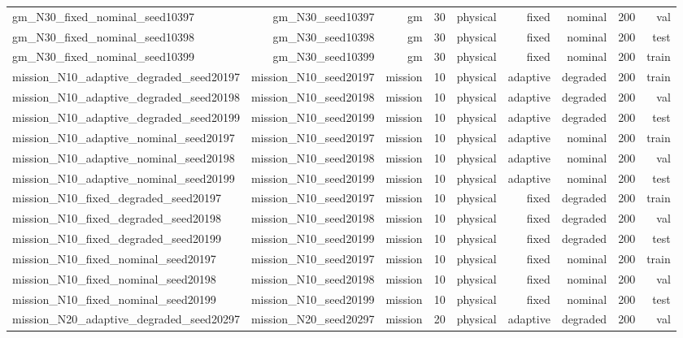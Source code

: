 \begin{tabular}{lrrrrrrrr}
gm\_N30\_fixed\_nominal\_seed10397 & gm\_N30\_seed10397 & gm & 30 & physical & fixed & nominal & 200 & val \\
gm\_N30\_fixed\_nominal\_seed10398 & gm\_N30\_seed10398 & gm & 30 & physical & fixed & nominal & 200 & test \\
gm\_N30\_fixed\_nominal\_seed10399 & gm\_N30\_seed10399 & gm & 30 & physical & fixed & nominal & 200 & train \\
mission\_N10\_adaptive\_degraded\_seed20197 & mission\_N10\_seed20197 & mission & 10 & physical & adaptive & degraded & 200 & train \\
mission\_N10\_adaptive\_degraded\_seed20198 & mission\_N10\_seed20198 & mission & 10 & physical & adaptive & degraded & 200 & val \\
mission\_N10\_adaptive\_degraded\_seed20199 & mission\_N10\_seed20199 & mission & 10 & physical & adaptive & degraded & 200 & test \\
mission\_N10\_adaptive\_nominal\_seed20197 & mission\_N10\_seed20197 & mission & 10 & physical & adaptive & nominal & 200 & train \\
mission\_N10\_adaptive\_nominal\_seed20198 & mission\_N10\_seed20198 & mission & 10 & physical & adaptive & nominal & 200 & val \\
mission\_N10\_adaptive\_nominal\_seed20199 & mission\_N10\_seed20199 & mission & 10 & physical & adaptive & nominal & 200 & test \\
mission\_N10\_fixed\_degraded\_seed20197 & mission\_N10\_seed20197 & mission & 10 & physical & fixed & degraded & 200 & train \\
mission\_N10\_fixed\_degraded\_seed20198 & mission\_N10\_seed20198 & mission & 10 & physical & fixed & degraded & 200 & val \\
mission\_N10\_fixed\_degraded\_seed20199 & mission\_N10\_seed20199 & mission & 10 & physical & fixed & degraded & 200 & test \\
mission\_N10\_fixed\_nominal\_seed20197 & mission\_N10\_seed20197 & mission & 10 & physical & fixed & nominal & 200 & train \\
mission\_N10\_fixed\_nominal\_seed20198 & mission\_N10\_seed20198 & mission & 10 & physical & fixed & nominal & 200 & val \\
mission\_N10\_fixed\_nominal\_seed20199 & mission\_N10\_seed20199 & mission & 10 & physical & fixed & nominal & 200 & test \\
mission\_N20\_adaptive\_degraded\_seed20297 & mission\_N20\_seed20297 & mission & 20 & physical & adaptive & degraded & 200 & val \\

\end{tabular}
